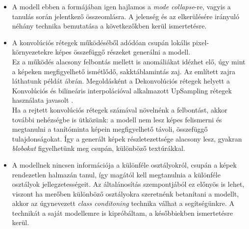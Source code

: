 \begin{itemize}
	\item A modell ebben a formájában igen hajlamos a \textit{mode collapse}-re, vagyis a tanulás során jelentkező összeomlásra. A jelenség és az elkerülésére irányuló néhány technika bemutatása a következőkben kerül ismertetésre.
	\item A konvolúciós rétegek működéséből adódóan csupán lokális pixel-környezetekre képes összefüggő részeket generálni a modell.\\
	Ez a működés alacsony felbontás mellett is anomáliákat idézhet elő, úgy mint a képeken megfigyelhető ismétlődő, sakktáblamintás zaj. Az említett zajra láthatunk példát  ábrán. Megoldásként a Dekonvolúciós rétegek helyett a Konvolúciós és bilineáris interpolációval alkalmazott UpSampling rétegek használata javasolt \cite{odena2016deconvolution}.\\
	Ha a rejtett konvolúciós rétegek számával növelnénk a felbontást, akkor további nehézségbe is ütközünk: a modell nem lesz képes felismerni és megtanulni a tanítóminta képein megfigyelhető távoli, összefüggő tulajdonságokat. Így a generált képek részletezettsége alacsony lesz, gyakran \textit{blobokat} figyelhetünk meg csupán, különböző textúrákkal. \cite{salimans2016improved}
	
	\item A modellnek nincsen információja a különféle osztályokról, csupán a képek rendezetlen halmazán tanul, így magától kell megtanulnia a különféle osztályok jellegzetességeit.
	Az általánosítás szempontjából ez előnyös is lehet, viszont ha merőben különböző osztályokra szeretnénk betanítani a modellt, akkor az úgynevezett \textit{class conditoning} technika válhat a segítségünkre. A technikát a saját modellemre is kipróbáltam, a későbbiekben ismertetésre kerül.

\end{itemize}


